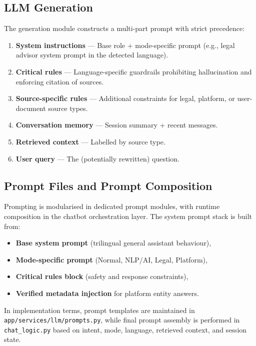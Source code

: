 \documentclass[12pt, a4paper]{article}
\begin{document}
\subsection{LLM Generation}

The generation module constructs a multi-part prompt with strict precedence:
\begin{enumerate}[leftmargin=2em]
  \item \textbf{System instructions} --- Base role + mode-specific prompt
        (e.g., legal advisor system prompt in the detected language).
  \item \textbf{Critical rules} --- Language-specific guardrails prohibiting
        hallucination and enforcing citation of sources.
  \item \textbf{Source-specific rules} --- Additional constraints for legal,
        platform, or user-document source types.
  \item \textbf{Conversation memory} --- Session summary + recent messages.
  \item \textbf{Retrieved context} --- Labelled by source type.
  \item \textbf{User query} --- The (potentially rewritten) question.
\end{enumerate}

\subsection{Prompt Files and Prompt Composition}

Prompting is modularised in dedicated prompt modules, with runtime
composition in the chatbot orchestration layer. The system prompt stack is
built from:
\begin{itemize}[leftmargin=2em]
      \item \textbf{Base system prompt} (trilingual general assistant behaviour),
      \item \textbf{Mode-specific prompt} (Normal, NLP/AI, Legal, Platform),
      \item \textbf{Critical rules block} (safety and response constraints),
      \item \textbf{Verified metadata injection} for platform entity answers.
\end{itemize}

In implementation terms, prompt templates are maintained in
\texttt{app/services/llm/prompts.py}, while final prompt assembly is
performed in \texttt{chat\_logic.py} based on intent, mode, language,
retrieved context, and session state.
\end{document}
